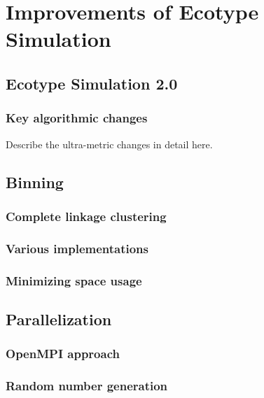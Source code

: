 \chapter{Improvements of Ecotype Simulation}
\section{Ecotype Simulation 2.0}
\subsection{Key algorithmic changes}
Describe the ultra-metric changes in detail here.
\section{Binning}
\subsection{Complete linkage clustering}
\subsection{Various implementations}
\subsection{Minimizing space usage}
\section{Parallelization}
\subsection{OpenMPI approach}
\subsection{Random number generation}